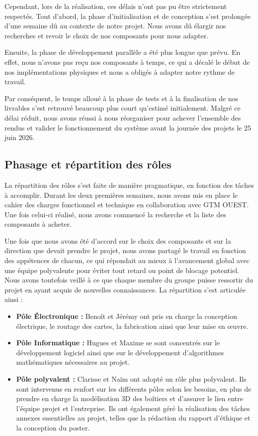 Cependant, lors de la réalisation, ces délais n'ont pas pu être strictement respectés. Tout d'abord, la phase d'initialisation et de conception s'est prolongée d’une semaine dû au contexte de notre projet. Nous avons dû élargir nos recherches et revoir le choix de nos composants pour nous adapter.

Ensuite, la phase de développement parallèle a été plus longue que prévu. En effet, nous n'avons pas reçu nos composants à temps, ce qui a décalé le début de nos implémentations physiques et nous a obligés à adapter notre rythme de travail.

Par conséquent, le temps alloué à la phase de tests et à la finalisation de nos livrables s'est retrouvé beaucoup plus court qu'estimé initialement. Malgré ce délai réduit, nous avons réussi à nous réorganiser pour achever l'ensemble des rendus et valider le fonctionnement du système avant la journée des projets le 25 juin 2026.


\subsection{Phasage et répartition des rôles}

La répartition des rôles s'est faite de manière pragmatique, en fonction des tâches à accomplir. Durant les deux premières semaines, nous avons mis en place le cahier des charges fonctionnel et technique en collaboration avec GTM OUEST. Une fois celui-ci réalisé, nous avons commencé la recherche et la liste des composants à acheter.

Une fois que nous avons été d'accord sur le choix des composants et sur la direction que devait prendre le projet, nous avons partagé le travail en fonction des appétences de chacun, ce qui répondait au mieux à l'avancement global avec une équipe polyvalente pour éviter tout retard ou point de blocage potentiel. Nous avons toutefois veillé à ce que chaque membre du groupe puisse ressortir du projet en ayant acquis de nouvelles connaissances. La répartition s'est articulée ainsi :

\begin{itemize}
\item \textbf{Pôle Électronique :} Benoît et Jérémy ont pris en charge la conception électrique, le routage des cartes, la fabrication ainsi que leur mise en œuvre.
\item \textbf{Pôle Informatique :} Hugues et Maxime se sont concentrés sur le développement logiciel ainsi que sur le développement d'algorithmes mathématiques nécessaires au projet.
\item \textbf{Pôle polyvalent :} Clarisse et Naïm ont adopté un rôle plus polyvalent. Ils sont intervenus en renfort sur les différents pôles selon les besoins, en plus de prendre en charge la modélisation 3D des boîtiers et d'assurer le lien entre l'équipe projet et l'entreprise. Ils ont également géré la réalisation des tâches annexes essentielles au projet, telles que la rédaction du rapport d'éthique et la conception du poster.
\end{itemize}

